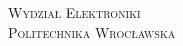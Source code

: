 \documentclass[a4paper, 11pt]{article}
\begin{document}
	
	
	
	\thispagestyle{empty}
	
	\vfill
	\begin{center}
		{\Large \textsc{Wydział Elektroniki}}\\
		{\Large \textsc{Politechnika Wrocławska}}
	\end{center}
	
	\newpage
	\tableofcontents
	
	\newpage
	
	
	
\end{document}
